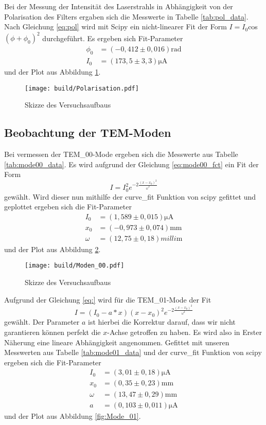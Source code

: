 Bei der Messung der Intensität des Laserstrahls in Abhängigkeit von der Polarisation des Filters ergaben sich die
Messwerte in Tabelle \ref{tab:pol_data}.
Nach Gleichung \ref{eq:pol} wird mit Scipy \cite{scipy} ein nicht-linearer Fit der Form $I = I_0$cos$(\phi+\phi_0)^2$ durchgeführt.
Es ergeben sich Fit-Parameter
\begin{align}
  \phi_0&=(-0,412\pm 0,016)\si{\radian}\nonumber\\
  I_0&=(173,5\pm 3,3)\si{\micro\ampere}\label{eqn:Parameter_Polarisation}
\end{align}
und der Plot aus Abbildung \ref{fig:Polarisation}.
\begin{figure}
  \centering
  \texttt{[image: build/Polarisation.pdf]}
  \caption{Skizze des Versuchsaufbaus}
  \label{fig:Polarisation}
\end{figure}


\subsection{Beobachtung der TEM-Moden}
Bei vermessen der TEM_{00}-Mode ergeben sich die Messwerte aus Tabelle \ref{tab:mode00_data}. 
Es wird aufgrund der Gleichung \eqref{eq:mode00_fct} ein Fit der Form
\begin{equation}
  I=I_0^2e^{-2\frac{(x-x_0)^2}{\omega^2}}
\end{equation}
gewählt. Wird dieser nun mithilfe der curve\_fit Funktion von scipy \cite{scipy} gefittet und geplottet ergeben sich die Fit-Parameter
\begin{align}
  I_0&=(1,589\pm0,015)\si{\micro\ampere}\nonumber\\
  x_0&=(-0,973\pm0,074)\si{\milli\meter}\nonumber\\
  \omega&=(12,75\pm0,18)\si{milli\meter}
\end{align}
und der Plot aus Abbildung \ref{fig:Mode_00}.
\begin{figure}
  \centering
  \texttt{[image: build/Moden\_00.pdf]}
  \caption{Skizze des Versuchsaufbaus}
  \label{fig:Mode_00}
\end{figure}
Aufgrund der Gleichung \eqref{eq:} wird für die TEM_{01}-Mode der Fit 
\begin{equation}
  I=(I_0-a*x)(x-x_0)^2e^{-2\frac{(x-x_0)^2}{\omega^2}}
\end{equation}
gewählt. Der Parameter $a$ ist hierbei die Korrektur darauf, dass wir nicht garantieren können perfekt die $x$-Achse getroffen zu haben.
Es wird also in Erster Näherung eine lineare Abhängigkeit angenommen.
Gefittet mit unseren Messwerten aus Tabelle \ref{tab:mode01_data} und der curve\_fit Funktion von scipy \cite{scipy} ergeben sich die Fit-Parameter 
\begin{align}
  I_0&=(3,01\pm0,18)\si{\micro\ampere}\nonumber\\
  x_0&=(0,35\pm0,23)\si{\milli\meter}\nonumber\\
  \omega&=(13,47\pm0,29)\si{\milli\meter}\nonumber\\
  a&=(0,103\pm0,011)\si{\micro\ampere}
\end{align}
und der Plot aus Abbildung \ref{fig:Mode_01}.

